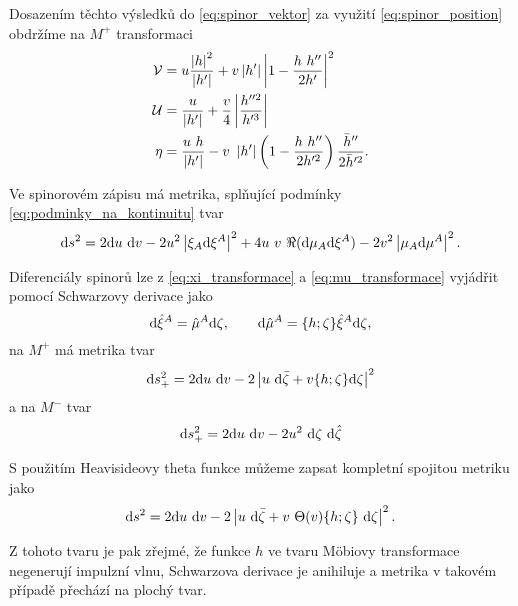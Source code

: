 Dosazením těchto výsledků do \eqref{eq:spinor_vektor} za využití \eqref{eq:spinor_position} obdržíme na $M^+$
transformaci
\begin{equation}
    \label{eq:refraction_spinor}
    \begin{split}
        \mathcal{V} &= u \frac{\left|h\right|^2}{\left|h'\right|} + v \left| h' \right| \left| 1 - \frac{h ~ h''}{2 h'} \right|^2 \\
        \mathcal{U} &= \frac{u}{\left|h'\right|} + \frac{v}{4} \left| \frac{h''^2}{h'^3}\right| \\
        \eta &= \frac{u ~ h}{ \left| h' \right|} - v ~ \left| h' \right| \left(1 - \frac{h ~ h''}{2 h'^2} \right) \frac{\bar{h}''}{2 \bar{h}'^2}.
    \end{split}
\end{equation}

Ve spinorovém zápisu má metrika, splňující podmínky \eqref{eq:podminky_na_kontinuitu} tvar
\begin{equation}
    \mathrm{d} s^2 = 2 \mathrm{d} u ~ \mathrm{d} v - 2 u^2 \left| \xi_A \mathrm{d} \xi^A \right|^2 + 4 u~v~ \Re(\mathrm{d} \mu_A \mathrm{d} \xi^A) - 2 v^2 \left|\mu_A \mathrm{d} \mu^A\right|^2.
\end{equation}

Diferenciály spinorů lze z \eqref{eq:xi_transformace} a \eqref{eq:mu_transformace} vyjádřit pomocí Schwarzovy derivace jako
\begin{equation}
    \mathrm{d} \hat{\xi}^A = \hat{\mu}^A \mathrm{d} \zeta, ~~~~~~ \mathrm{d} \hat{\mu}^A = \{h; \zeta\} \hat{\xi}^A \mathrm{d} \zeta,
\end{equation}
na $M^+$ má metrika tvar
\begin{equation}
    \mathrm{d} s_+^2 = 2 \mathrm{d} u ~ \mathrm{d} v - 2 \left| u ~ \mathrm{d} \bar{\zeta} + v \{h; \zeta \} \mathrm{d} \zeta \right|^2
\end{equation}
a na $M^-$ tvar
\begin{equation}
    \mathrm{d} s_+^2 = 2 \mathrm{d} u ~ \mathrm{d} v - 2 u^2 ~ \mathrm{d} \zeta ~ \mathrm{d} \hat{\zeta}
\end{equation}

S použitím Heavisideovy theta funkce můžeme zapsat kompletní spojitou metriku
jako
\begin{equation}
    \mathrm{d} s^2 = 2 \mathrm{d} u ~ \mathrm{d} v - 2 \left| u ~ \mathrm{d} \bar{\zeta} + v ~ \Theta(v) \{h;\zeta\} ~ \mathrm{d} \zeta \right|^2.
\end{equation}

Z tohoto tvaru je pak zřejmé, že funkce $h$ ve tvaru Möbiovy transformace negenerují impulzní vlnu,
Schwarzova derivace je anihiluje a metrika v takovém případě přechází na plochý tvar.

